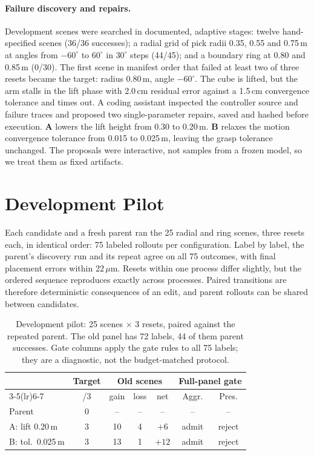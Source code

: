 \documentclass[letterpaper]{article} %
\begin{document}
\paragraph{Failure discovery and repairs.} Development scenes were searched in documented, adaptive stages: twelve hand-specified scenes (36/36 successes); a radial grid of pick radii 0.35, 0.55 and 0.75\,m at angles from $-60^\circ$ to $60^\circ$ in $30^\circ$ steps (44/45); and a boundary ring at 0.80 and 0.85\,m (0/30). The first scene in manifest order that failed at least two of three resets became the target: radius 0.80\,m, angle $-60^\circ$. The cube is lifted, but the arm stalls in the lift phase with 2.0\,cm residual error against a 1.5\,cm convergence tolerance and times out. A coding assistant inspected the controller source and failure traces and proposed two single-parameter repairs, saved and hashed before execution. \textbf{A} lowers the lift height from 0.30 to 0.20\,m. \textbf{B} relaxes the motion convergence tolerance from 0.015 to 0.025\,m, leaving the grasp tolerance unchanged. The proposals were interactive, not samples from a frozen model, so we treat them as fixed artifacts.

\section{Development Pilot}
Each candidate and a fresh parent ran the 25 radial and ring scenes, three resets each, in identical order: 75 labeled rollouts per configuration. Label by label, the parent's discovery run and its repeat agree on all 75 outcomes, with final placement errors within 22\,$\mu$m. Resets within one process differ slightly, but the ordered sequence reproduces exactly across processes. Paired transitions are therefore deterministic consequences of an edit, and parent rollouts can be shared between candidates.

\begin{table}[t]
\centering
\small
\setlength{\tabcolsep}{3.2pt}
\begin{tabular}{lcccccc}
\toprule
 & Target & \multicolumn{3}{c}{Old scenes} & \multicolumn{2}{c}{Full-panel gate} \\
\cmidrule(lr){3-5}\cmidrule(lr){6-7}
 & /3 & gain & loss & net & Aggr. & Pres. \\
\midrule
Parent & 0 & -- & -- & -- & -- & -- \\
A: lift 0.20\,m & 3 & 10 & 4 & $+6$ & admit & reject \\
B: tol.\ 0.025\,m & 3 & 13 & 1 & $+12$ & admit & reject \\
\bottomrule
\end{tabular}
\caption{Development pilot: 25 scenes $\times$ 3 resets, paired against the repeated parent. The old panel has 72 labels, 44 of them parent successes. Gate columns apply the gate rules to all 75 labels; they are a diagnostic, not the budget-matched protocol.}
\label{tab:pilot}
\end{table}
\end{document}
